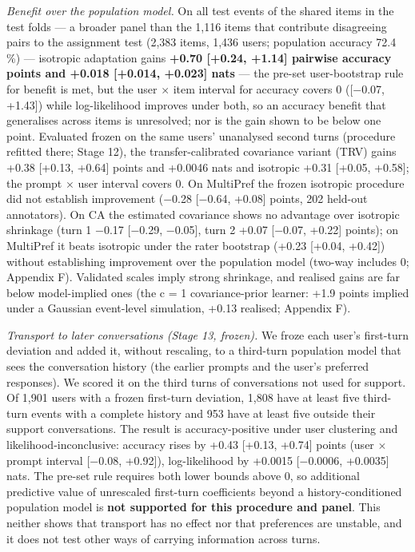 \documentclass{article}
\begin{document}
\emph{Benefit over the population model.} On all test events of the shared items in the test folds --- a broader panel than the 1,116 items that contribute disagreeing pairs to the assignment test (2,383 items, 1,436 users; population accuracy 72.4 \%) --- isotropic adaptation gains \textbf{+0.70 {[}+0.24, +1.14{]} pairwise accuracy points and +0.018 {[}+0.014, +0.023{]} nats} --- the pre-set user-bootstrap rule for benefit is met, but the user $\times$ item interval for accuracy covers 0 ({[}$-$0.07, +1.43{]}) while log-likelihood improves under both, so an accuracy benefit that generalises across items is unresolved; nor is the gain shown to be below one point. Evaluated frozen on the same users' unanalysed second turns (procedure refitted there; Stage 12), the transfer-calibrated covariance variant (TRV) gains +0.38 {[}+0.13, +0.64{]} points and +0.0046 nats and isotropic +0.31 {[}+0.05, +0.58{]}; the prompt $\times$ user interval covers 0. On MultiPref the frozen isotropic procedure did not establish improvement ($-$0.28 {[}$-$0.64, +0.08{]} points, 202 held-out annotators). On CA the estimated covariance shows no advantage over isotropic shrinkage (turn 1 $-$0.17 {[}$-$0.29, $-$0.05{]}, turn 2 +0.07 {[}$-$0.07, +0.22{]} points); on MultiPref it beats isotropic under the rater bootstrap (+0.23 {[}+0.04, +0.42{]}) without establishing improvement over the population model (two-way includes 0; Appendix F). Validated scales imply strong shrinkage, and realised gains are far below model-implied ones (the c = 1 covariance-prior learner: +1.9 points implied under a Gaussian event-level simulation, +0.13 realised; Appendix F).

\emph{Transport to later conversations (Stage 13, frozen).} We froze each user's first-turn deviation and added it, without rescaling, to a third-turn population model that sees the conversation history (the earlier prompts and the user's preferred responses). We scored it on the third turns of conversations not used for support. Of 1,901 users with a frozen first-turn deviation, 1,808 have at least five third-turn events with a complete history and 953 have at least five outside their support conversations. The result is accuracy-positive under user clustering and likelihood-inconclusive: accuracy rises by +0.43 {[}+0.13, +0.74{]} points (user $\times$ prompt interval {[}$-$0.08, +0.92{]}), log-likelihood by +0.0015 {[}$-$0.0006, +0.0035{]} nats. The pre-set rule requires both lower bounds above 0, so additional predictive value of unrescaled first-turn coefficients beyond a history-conditioned population model is \textbf{not supported for this procedure and panel}. This neither shows that transport has no effect nor that preferences are unstable, and it does not test other ways of carrying information across turns.
\end{document}
